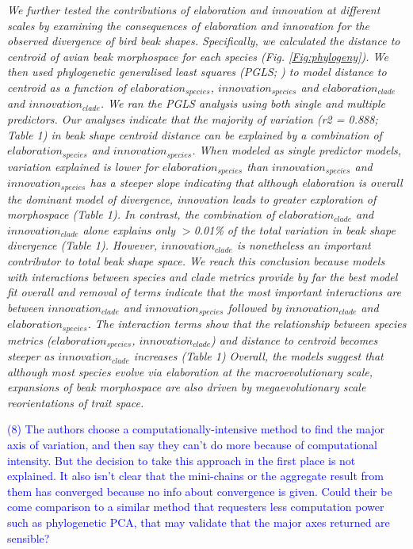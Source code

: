 \documentclass[12pt,letterpaper]{article}
\begin{document}
{\noindent\textit{We further tested the contributions of elaboration and innovation at different scales by examining the consequences of elaboration and innovation for the observed divergence of bird beak shapes. Specifically, we calculated the distance to centroid of avian beak morphospace for each species (Fig. \ref{Fig:phylogeny}).
We then used phylogenetic generalised least squares (PGLS; \cite{phylom}) to model distance to centroid as a function of $elaboration_{species}$, $innovation_{species}$ and $elaboration_{clade}$ and $innovation_{clade}$.
We ran the PGLS analysis using both single and multiple predictors.
Our analyses indicate that the majority of variation (r2 = 0.888; Table 1) in beak shape centroid distance can be explained by a combination of $elaboration_{species}$ and $innovation_{species}$.
When modeled as single predictor models, variation explained is lower for $elaboration_{species}$ than $innovation_{species}$ and $innovation_{species}$ has a steeper slope indicating that although elaboration is overall the dominant model of divergence, innovation leads to greater exploration of morphospace (Table 1).
In contrast, the combination of $elaboration_{clade}$ and $innovation_{clade}$ alone explains only $>$0.01\% of the total variation in beak shape divergence (Table 1).
However, $innovation_{clade}$ is nonetheless an important contributor to total beak shape space.
We reach this conclusion because models with interactions between species and clade metrics provide by far the best model fit overall and removal of terms indicate that the most important interactions are between $innovation_{clade}$  and $innovation_{species}$ followed by $innovation_{clade}$ and $elaboration_{species}$.
The interaction terms show that the relationship between species metrics ($elaboration_{species}$, $innovation_{clade}$) and distance to centroid becomes steeper as $innovation_{clade}$ increases (Table 1)
Overall, the models suggest that although most species evolve via elaboration at the macroevolutionary scale, expansions of beak morphospace are also driven by megaevolutionary scale reorientations of trait space.
}

\textcolor{blue}{(8) The authors choose a computationally-intensive method to find the major axis of variation, and then say they can't do more because of computational intensity. But the decision to take this approach in the first place is not explained. It also isn't clear that the mini-chains or the aggregate result from them has converged because no info about convergence is given. Could their be come comparison to a similar method that requesters less computation power such as phylogenetic PCA, that may validate that the major axes returned are sensible?}

}
\end{document}
